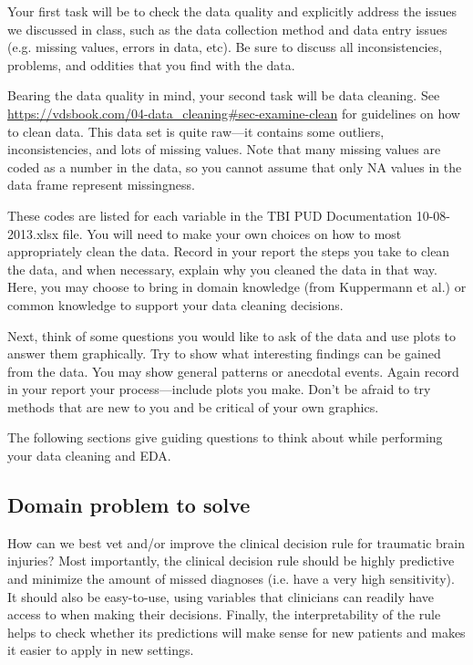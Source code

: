 \documentclass[10pt,letterpaper]{article}
\begin{document}
Your first task will be to check the data quality and explicitly address the issues we discussed in class, such as the data collection method and data entry issues (e.g. missing values, errors in data, etc). Be sure to discuss all inconsistencies, problems, and oddities that you find with the data.

Bearing the data quality in mind, your second task will be data cleaning. See \url{https://vdsbook.com/04-data_cleaning#sec-examine-clean} for guidelines on how to clean data. This data set is quite raw---it contains some outliers, inconsistencies, and lots of missing values. Note that many missing values are coded as a number in the data, so you cannot assume that only NA values in the data frame represent missingness.

These codes are listed for each variable in the TBI PUD Documentation 10-08-2013.xlsx file. You will need to make your own choices on how to most appropriately clean the data. Record in your report the steps you take to clean the data, and when necessary, explain why you cleaned the data in that way. Here, you may choose to bring in domain knowledge (from Kuppermann et al.) or common knowledge to support your data cleaning decisions.

Next, think of some questions you would like to ask of the data and use plots to answer them graphically. Try to show what interesting findings can be gained from the data. You may show general patterns or anecdotal events. Again record in your report your process---include plots you make. Don’t be afraid to try methods that are new to you and be critical of your own graphics.

The following sections give guiding questions to think about while performing your data cleaning and EDA.

\subsection*{Domain problem to solve}

How can we best vet and/or improve the clinical decision rule for traumatic brain injuries? Most importantly, the clinical decision rule should be highly predictive and minimize the amount of missed diagnoses (i.e. have a very high sensitivity). It should also be easy-to-use, using variables that clinicians can readily have access to when making their decisions. Finally, the interpretability of the rule helps to check whether its predictions will make sense for new patients and makes it easier to apply in new settings.
\end{document}
